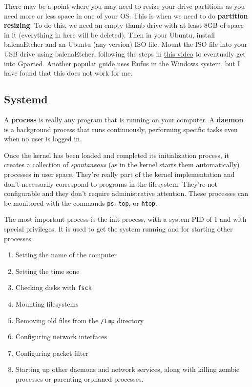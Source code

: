   There may be a point where you may need to resize your drive partitions as you need more or less space in one of your OS. This is when we need to do \textbf{partition resizing}. To do this, we need an empty thumb drive with at least 8GB of space in it (everything in here will be deleted). Then in your Ubuntu, install balenaEtcher and an Ubuntu (any version) ISO file. Mount the ISO file into your USB drive using balenaEtcher, following the steps in \href{https://www.youtube.com/watch?v=Kyz9x71gEPI&t=504s}{this video} to eventually get into Gparted. Another popular \href{https://www.youtube.com/watch?v=vlVXPtJ20hA&t=467s}{guide} uses Rufus in the Windows system, but I have found that this does not work for me. 

\subsection{Systemd} 

  A \textbf{process} is really any program that is running on your computer. A \textbf{daemon} is a background process that runs continuously, performing specific tasks even when no user is logged in. 

  Once the kernel has been loaded and completed its initialization process, it creates a collection of \textit{spontaneous} (as in the kernel starts them automatically) processes in user space. They're really part of the kernel implementation and don't necessarily correspond to programs in the filesystem. They're not configurable and they don't require administrative attention. These processes can be monitored with the commands \texttt{ps}, \texttt{top}, or \texttt{htop}.

  The most important process is the init process, with a system PID of 1 and with special privileges. It is used to get the system running and for starting other processes. 

  \begin{enumerate}
    \item Setting the name of the computer 
    \item Setting the time sone 
    \item Checking disks with \texttt{fsck} 
    \item Mounting filesystems 
    \item Removing old files from the \texttt{/tmp} directory 
    \item Configuring network interfaces
    \item Configuring packet filter 
    \item Starting up other daemons and network services, along with killing zombie processes or parenting orphaned processes. 
  \end{enumerate}

